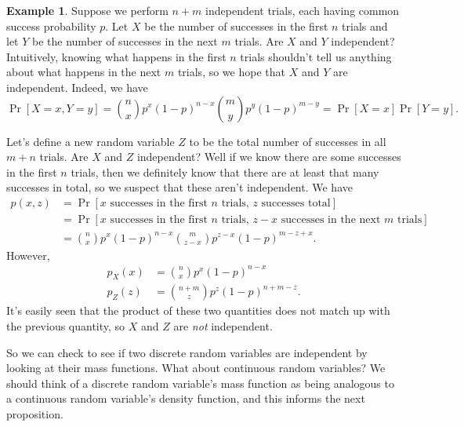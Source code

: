 \documentclass[12pt]{article}
\theoremstyle{plain}
\theoremstyle{definition}
\newtheorem{example}[theorem]{Example}
\theoremstyle{remark}
\begin{document}
\begin{example}
    Suppose we perform $n+m$ independent trials, each having common success probability $p$.
    Let $X$ be the number of successes in the first $n$ trials and let $Y$ be the number of successes in the next $m$ trials.
    Are $X$ and $Y$ independent?
    Intuitively, knowing what happens in the first $n$ trials shouldn't tell us anything about what happens in the next $m$ trials, so we hope that $X$ and $Y$ are independent.
    Indeed, we have
    \[
        \Pr[X = x, Y=y] = \binom{n}{x}p^x(1-p)^{n-x}\binom{m}{y}p^y(1-p)^{m-y}= \Pr[X=x]\Pr[Y=y].
    \]

    Let's define a new random variable $Z$ to be the total number of successes in all $m+n$ trials.
    Are $X$ and $Z$ independent?
    Well if we know there are some successes in the first $n$ trials, then we definitely know that there are at least that many successes in total, so we suspect that these aren't independent.
    We have
    \begin{align*}
        p(x,z) &= \Pr[x\text{ successes in the first $n$ trials, $z$ successes total}]\\
        &= \Pr[x\text{ successes in the first $n$ trials, $z-x$ successes in the next $m$ trials}]\\
        &= \binom{n}{x}p^x(1-p)^{n-x}\binom{m}{z-x}p^{z-x}(1-p)^{m-z+x}.
    \end{align*}
    However,
    \begin{align*}
        p_X(x) &= \binom{n}{x}p^x(1-p)^{n-x}\\
        p_Z(z) &= \binom{n+m}{z}p^z(1-p)^{n+m-z}.
    \end{align*}
    It's easily seen that the product of these two quantities does not match up with the previous quantity, so $X$ and $Z$ are \emph{not} independent.
\end{example}

So we can check to see if two discrete random variables are independent by looking at their mass functions.
What about continuous random variables?
We should think of a discrete random variable's mass function as being analogous to a continuous random variable's density function, and this informs the next proposition.
\end{document}
